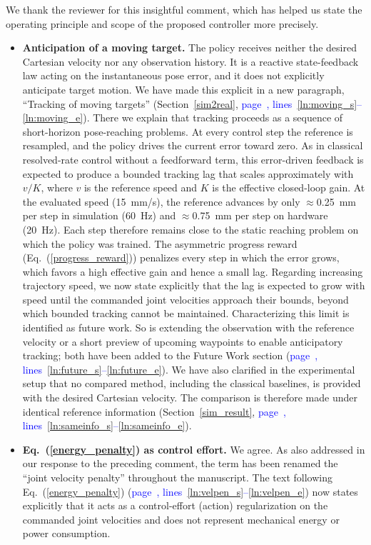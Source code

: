 \documentclass[11pt]{elsarticle}
\newcommand{\mlines}[2]{\textcolor{blue}{page~\pageref{#1}, lines~\ref{#1}--\ref{#2}}}
\begin{document}
\begin{responsebox}
We thank the reviewer for this insightful comment, which has helped us state the operating principle and scope of the proposed controller more precisely.

\begin{itemize}
  \item \textbf{Anticipation of a moving target.} The policy receives neither the desired Cartesian velocity nor any observation history. It is a reactive state-feedback law acting on the instantaneous pose error, and it does not explicitly anticipate target motion. We have made this explicit in a new paragraph, ``Tracking of moving targets'' (Section~\ref{sim2real}, \mlines{ln:moving_s}{ln:moving_e}). There we explain that tracking proceeds as a sequence of short-horizon pose-reaching problems. At every control step the reference is resampled, and the policy drives the current error toward zero. As in classical resolved-rate control without a feedforward term, this error-driven feedback is expected to produce a bounded tracking lag that scales approximately with $v/K$, where $v$ is the reference speed and $K$ is the effective closed-loop gain. At the evaluated speed (15~mm/s), the reference advances by only $\approx$0.25~mm per step in simulation (60~Hz) and $\approx$0.75~mm per step on hardware (20~Hz). Each step therefore remains close to the static reaching problem on which the policy was trained. The asymmetric progress reward (Eq.~(\ref{progress_reward})) penalizes every step in which the error grows, which favors a high effective gain and hence a small lag. Regarding increasing trajectory speed, we now state explicitly that the lag is expected to grow with speed until the commanded joint velocities approach their bounds, beyond which bounded tracking cannot be maintained. Characterizing this limit is identified as future work. So is extending the observation with the reference velocity or a short preview of upcoming waypoints to enable anticipatory tracking; both have been added to the Future Work section (\mlines{ln:future_s}{ln:future_e}). We have also clarified in the experimental setup that no compared method, including the classical baselines, is provided with the desired Cartesian velocity. The comparison is therefore made under identical reference information (Section~\ref{sim_result}, \mlines{ln:sameinfo_s}{ln:sameinfo_e}).

  \item \textbf{Eq.~(\ref{energy_penalty}) as control effort.} We agree. As also addressed in our response to the preceding comment, the term has been renamed the ``joint velocity penalty'' throughout the manuscript. The text following Eq.~(\ref{energy_penalty}) (\mlines{ln:velpen_s}{ln:velpen_e}) now states explicitly that it acts as a control-effort (action) regularization on the commanded joint velocities and does not represent mechanical energy or power consumption.


\end{itemize}
\end{responsebox}
\end{document}
